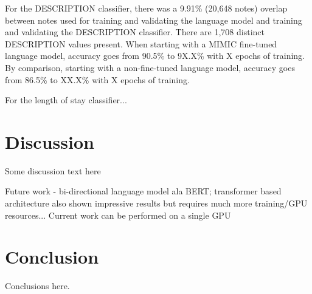 \documentclass{amia}
\begin{document}
For the DESCRIPTION classifier, there was a 9.91\% (20,648 notes) overlap between notes used for training and validating the language model and training and validating the DESCRIPTION classifier. There are 1,708 distinct DESCRIPTION values present. When starting with a MIMIC fine-tuned language model,  accuracy goes from 90.5\% to 9X.X\% with X epochs of training. By comparison, starting with a non-fine-tuned language model, accuracy goes from 86.5\% to XX.X\% with X epochs of training.

For the length of stay classifier...

\section*{Discussion}

Some discussion text here

Future work - bi-directional language model ala BERT; transformer based architecture also shown impressive results but requires much more training/GPU resources...
Current work can be performed on a single GPU

\section*{Conclusion}
Conclusions here.



\end{document}
